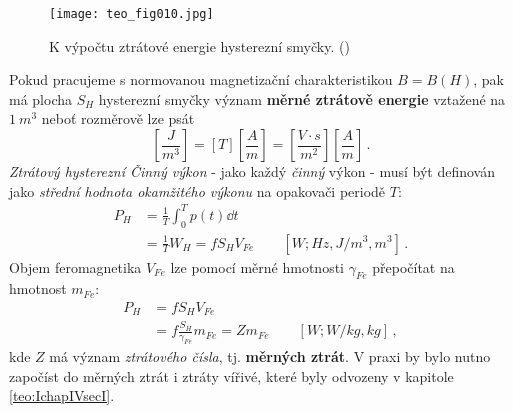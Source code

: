       \begin{figure}[ht!] %
        \centering
        \texttt{[image: teo\_fig010.jpg]}
        \caption{K výpočtu ztrátové energie hysterezní smyčky.
                 (\cite[s.~159]{Patocka4})}
        \label{teo:fig010}
      \end{figure}
      
      Pokud pracujeme s normovanou magnetizační charakteristikou \(B = B(H)\), pak má plocha 
      \(S_H\) hysterezní smyčky význam \textbf{měrné ztrátově energie} vztažené na \(\SI{1}{m^3}\) 
      neboť rozměrově lze psát
      \begin{equation*}
        \left[\frac{J}{m^3}\right] = [T]\left[\frac{A}{m}\right] 
                                   = \left[\frac{V\cdot s}{m^2}\right]\left[\frac{A}{m}\right] \,.
      \end{equation*}
      \emph{Ztrátový hysterezní Činný výkon} - jako každý \emph{činný} výkon - musí být definován 
      jako \emph{střední hodnota okamžitého výkonu} na opakovači periodě \(T\): 
      \begin{align}\label{TEO:eq041}
        P_H &= \frac{1}{T}\int_0^Tp(t)\dd{t}          \nonumber \\
            &= \frac{1}{T}W_H = fS_HV_{Fe}
               \qquad[W;Hz, J/m^3, m^3]\,.
      \end{align}
      Objem feromagnetika \(V_{Fe}\) lze pomocí měrné hmotnosti \(\gamma_{Fe}\) přepočítat na 
      hmotnost \(m_{Fe}\): 
      \begin{align}\label{TEO:eq042}
        P_H &= fS_HV_{Fe}                            \nonumber \\
            &= f\frac{S_H}{\gamma_{Fe}}m_{Fe} = Zm_{Fe} 
               \qquad[W; W/kg, kg]\,,
      \end{align}
      kde \(Z\) má význam \emph{ztrátového čísla}, tj. \textbf{měrných ztrát}. V praxi by bylo 
      nutno započíst do měrných ztrát i ztráty vířivé, které byly odvozeny v kapitole 
      \ref{teo:IchapIVsecI}.
      
